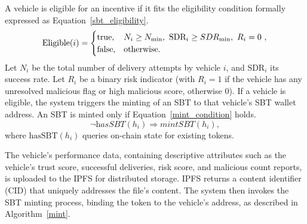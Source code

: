 \cite{cho2010survey}\documentclass[journal,comsoc,twoside]{IEEEtran}
\begin{document}
A vehicle is eligible for an incentive if it fits the eligibility condition formally expressed as Equation~\ref{sbt_eligibility}.  
\begin{equation}
\label{sbt_eligibility}
\text{Eligible}(i) =
\begin{cases}
\text{true}, & N_i \ge N_{\min},\ \text{SDR}_i \ge SDR_{\min},\ R_i = 0~,\cr
\text{false}, & \text{otherwise.}
\end{cases}
\end{equation}
Let $N_i$ be the total number of delivery attempts by vehicle $i$, and $\text{SDR}_i$ its success rate. Let $R_i$ be a binary risk indicator (with $R_i=1$ if the vehicle has any unresolved malicious flag or high malicious score, otherwise 0). If a vehicle is eligible, the system triggers the minting of an SBT to that vehicle's SBT wallet address. An SBT is minted only if Equation~\ref{mint_condition} holds.
\begin{equation}
\label{mint_condition}
\neg\textit{hasSBT}(h_i) \Rightarrow \textit{mintSBT}(h_i),
\end{equation}
where $\text{hasSBT}(h_i)$ queries on-chain state for existing tokens.

The vehicle’s performance data, containing descriptive attributes such as the vehicle’s trust score, successful deliveries, risk score, and malicious count reports, is uploaded to the IPFS for distributed storage. IPFS returns a content identifier (CID) that uniquely addresses the file’s content. The system then invokes the SBT minting process, binding the token to the vehicle's address, as described in Algorithm~\ref{mint}.
\begin{algorithm}[!htbp]
\caption{SBT Minting Procedure}
\label{mint}
\end{algorithm}
\end{document}
